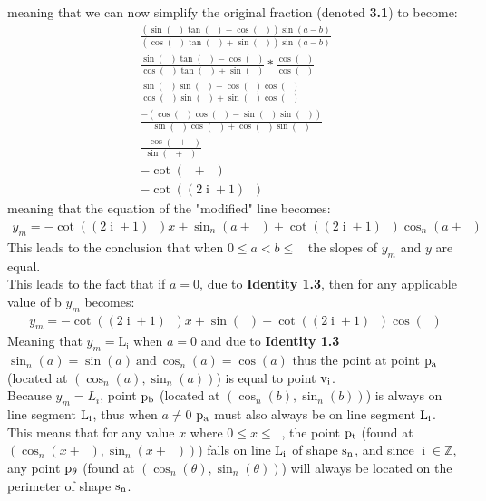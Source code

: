 \documentclass[11pt]{article}
\DeclareMathOperator{\custi}{\mathrm{i}}
\DeclareMathOperator{\period}{\frac{2\pi}{n}}
\DeclareMathOperator{\hp}{\frac{\pi}{n}}
\DeclareMathOperator{\iperiod}{\frac{2\custi\pi}{n}}
\begin{document}
meaning that we can now simplify the original fraction (denoted \textbf{3.1}) to become:
\begin{gather*}
\frac{(\sin(\iperiod)\tan(\hp)-\cos(\iperiod))\sin(a-b)}{(\cos(\iperiod)\tan(\hp)+\sin(\iperiod))\sin(a-b)}\\
\frac{\sin(\iperiod)\tan(\hp)-\cos(\iperiod)}{\cos(\iperiod)\tan(\hp)+\sin(\iperiod)} * \frac{\cos(\hp)}{\cos(\hp)}\\
\frac{\sin(\iperiod)\sin(\hp)-\cos(\iperiod)\cos(\hp)}{\cos(\iperiod)\sin(\hp)+\sin(\iperiod)\cos(\hp)}\\
\frac{-(\cos(\iperiod)\cos(\hp)-\sin(\iperiod)\sin(\hp))}{\sin(\hp)\cos(\iperiod)+\cos(\hp)\sin(\iperiod)}\\
\frac{-\cos(\iperiod+\hp)}{\sin(\iperiod+\hp)}\\
-\cot(\iperiod+\hp)\\
-\cot((2\custi+1)\hp)
\end{gather*}
meaning that the equation of the "modified" line becomes:
\begin{gather*}
y_m=-\cot((2\custi+1)\hp)x+\sin_n(a+\iperiod)+\cot((2\custi+1)\hp)\cos_n(a+\iperiod)
\end{gather*}
This leads to the conclusion that when \(0\leq a<b\leq\period\) the slopes of \(y_m\) and \(y\) are equal. \\
This leads to the fact that if \(a=0\), due to \textbf{Identity 1.3}, then for any applicable value of b \(y_m\) becomes:
\begin{gather*}
y_m=-\cot((2\custi+1)\hp)x+\sin(\iperiod)+\cot((2\custi+1)\hp)\cos(\iperiod)
\end{gather*}
Meaning that \(y_m=\mathrm{L_i}\) when \(a=0\) and due to \textbf{Identity 1.3} \(\sin_n(a)=\sin(a) \mathrm{\ and\ } \cos_n(a)=\cos(a)\) thus the point at point \(\rm p_a\) (located at \((\cos_n(a), \sin_n(a))\)) is equal to point \(\rm v_i\).\\
Because \(y_m = L_i\), point \(\rm p_b\) (located at \((\cos_n(b),\sin_n(b))\)) is always on line segment \(\rm L_i\), thus when \(a\neq0\) \(\rm p_a\) must also always be on line segment \(\rm L_i\).\\
This means that for any value \(x\) where \(0\leq x \leq\period\), the point \(\rm p_t\) (found at \((\cos_n(x+\iperiod),\sin_n(x+\iperiod))\)) falls on line \(\rm L_i\) of shape \(\rm s_n\), and since \(\custi\in\mathbb{Z}\), any point \(\rm p_\theta\) (found at \((\cos_n(\theta),\sin_n(\theta))\)) will always be located on the perimeter of shape \(\rm s_n\).
\end{document}
